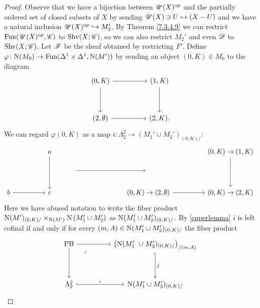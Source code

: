 \documentclass[../../thesis.tex]{subfiles}
\begin{document}
\begin{proof}
    Observe that we have a bijection between $\mathscr{U}(X)^{op}$ and the partially ordered set of closed subsets of $X$ by sending $\mathscr{U}(X) \ni U \mapsto (X - U)$ and we have a natural inclusion $\mathscr{U}(X)^{op} \hookrightarrow M_2'$.
    By Theorem \ref{7.3.4.9} we can restrict $\mathrm{Fun}(\mathscr{U}(X)^{op}, \mathscr{C})$ to $\mathrm{Shv}(X;\mathscr{C})$, so we can also restrict $M_2'$ and even $\mathscr{D}$ to $\mathrm{Shv}(X;\mathscr{C})$.
    Let $\mathscr{F}$ be the sheaf obtained by restricting $F'$.
    Define $\varphi\colon\mathrm{N}(M_0) \to \mathrm{Fun}(\Delta^1\times \Delta^1, \mathrm{N}(M'))$ by sending an object $(0,K) \in M_0$ to the diagram
    \[\begin{tikzcd}
            {(0,K)} && {(1,K)} \\
            \\
            {(2,\emptyset)} && {(2,K)}
            \arrow[from=1-1, to=1-3]
            \arrow[from=1-3, to=3-3]
            \arrow[from=3-1, to=3-3]
            \arrow[from=1-1, to=3-1].
        \end{tikzcd}\]
    We can regard $\varphi(0,K)$ as a map $i: \Lambda_2^2 \to (M_1'\cup M_2')_{(0,K)/}$:
    \[\begin{tikzcd}
            && a &&&&&& {(0,K)\to(1,K)} \\
            &&& {} &&& {} \\
            b && c &&&& {(0,K)\to(2,\emptyset)} && {(0,K)\to(2,K)}
            \arrow[from=1-9, to=3-9]
            \arrow[from=3-7, to=3-9]
            \arrow[from=3-1, to=3-3]
            \arrow[from=1-3, to=3-3]
            \arrow[from=2-4, to=2-7]
        \end{tikzcd}\]
    Here we have abused notation to write the fiber product $\mathrm{N}(M')_{(0, K) /} \times_{\mathrm{N}(M')}\mathrm{N}\left(M_1^{\prime} \cup M_2^{\prime}\right)$ as $ \mathrm{N}(M_1'\cup M_2')_{(0,K)/}$. By \ref{superlemma} $i$ is left cofinal if and only if for every $(m,A) \in \mathrm{N}(M_1'\cup M_2')_{(0,K)/}$ the fiber product
    \[\begin{tikzcd}
            {\mathrm{PB}} && {\left(\Nerve(M_1' \cup M_2')_{(0,K)/}\right)_{/(m,A)}} \\
            \\
            {\Lambda_2^2} && {\Nerve(M_1'\cup M_2')_{(0,K)/}}
            \arrow[from=1-1, to=1-3]
            \arrow["j", hook',from=1-3, to=3-3]
            \arrow["i", hook,from=3-1, to=3-3]
            \arrow[from=1-1, to=3-1]
            \arrow["\lrcorner"{anchor=center, pos=0.125}, draw=none, from=1-1, to=3-3]
        \end{tikzcd}\]

\end{proof}
\end{document}

